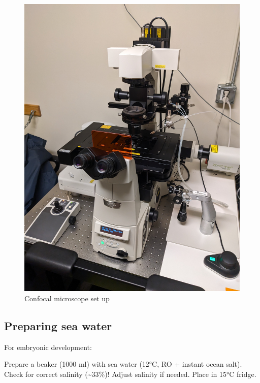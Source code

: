 \documentclass[
  letterpaper,
  DIV=11,
  numbers=noendperiod]{scrartcl}
\begin{document}
\begin{figure}
\begin{minipage}[t]{0.50\linewidth}
{{\includegraphics{micro_photos/included/confocal_microscope.jpg}

}

}

\subcaption{\label{fig-holder3}}
\end{minipage}%

\caption{\label{fig-eggs}Confocal microscope set up}

\end{figure}

\hypertarget{preparing-sea-water}{%
\subsection{Preparing sea water}\label{preparing-sea-water}}

For embryonic development:

Prepare a beaker (1000 ml) with sea water (12°C, RO + instant ocean
salt). Check for correct salinity (\textasciitilde33\%)! Adjust salinity
if needed. Place in 15°C fridge.
\end{document}
